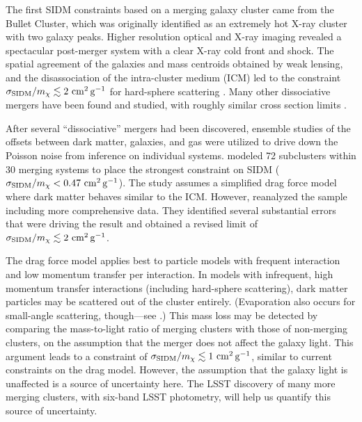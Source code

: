 
The first SIDM constraints based on a merging galaxy cluster came from the Bullet Cluster, which was originally identified as an extremely hot X-ray cluster with two galaxy peaks. Higher resolution optical and X-ray imaging revealed a spectacular post-merger system with a clear X-ray cold front and shock. The spatial agreement of the galaxies and mass centroids obtained by weak lensing, and the disassociation of the intra-cluster medium (ICM) led to the constraint $\sigma_{\rm SIDM}/m_\chi \lesssim 2 \mathrm{\,\mathrm{\,cm}^2\mathrm{\,g}^{-1}}$ for hard-sphere scattering \citep{Markevitch2004,Randall:2007ph,2017MNRAS.465..569R,Robertson:2016qef}. Many other dissociative mergers have been found and studied, with roughly similar cross section limits \citep[but with greater systematic uncertainty, \eg][]{bradac2008}. 

After several ``dissociative'' mergers had been discovered, ensemble studies of the offsets between dark matter, galaxies, and gas were utilized to drive down the Poisson noise from inference on individual systems. \citet{Harvey:2015hha} modeled 72 subclusters within 30 merging systems to place the strongest constraint on SIDM ($\sigma_{\rm SIDM}/m_\chi<0.47 \mathrm{\,\mathrm{\,cm}^2\mathrm{\,g}^{-1}}$).
The study assumes a simplified drag force model where dark matter behaves similar to the ICM. However, \citet{Wittman:2017gxn} reanalyzed the sample including more comprehensive data. They identified several substantial errors that were driving the result and obtained a revised limit of $\sigma_{\rm SIDM}/m_\chi \lesssim 2\mathrm{\,\mathrm{\,cm}^2\mathrm{\,g}^{-1}}$.

The drag force model applies best to particle models with frequent interaction and low momentum transfer per interaction. In models with infrequent, high momentum transfer interactions (including hard-sphere scattering), dark matter particles may be scattered out of the cluster entirely. (Evaporation also occurs for small-angle scattering, though---see \citealt{Kahlhoefer:2013dca}.) This mass loss may be detected by comparing the mass-to-light ratio of merging clusters with those of non-merging clusters, on the assumption that the merger does not affect the galaxy light. This argument leads to a constraint of $\sigma_{\rm SIDM}/m_\chi \lesssim 1 \mathrm{\,\mathrm{\,cm}^2\mathrm{\,g}^{-1}}$, similar to current constraints on the drag model. However, the assumption that the galaxy light is unaffected is a source of uncertainty here. The LSST discovery of many more merging clusters, with six-band LSST photometry, will help us quantify this source of uncertainty. 

